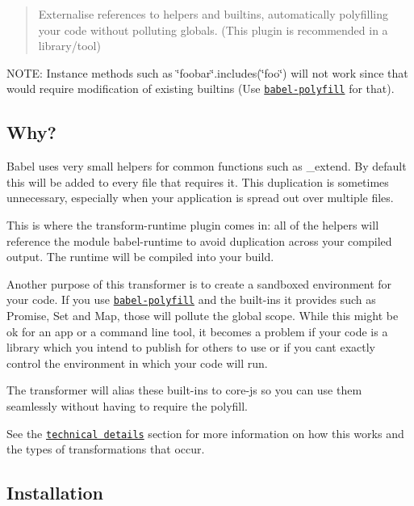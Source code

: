 \begin{quote}
Externalise references to helpers and builtins, automatically polyfilling your code without polluting globals. (This plugin is recommended in a library/tool) \end{quote}


N\+O\+TE\+: Instance methods such as {\ttfamily \char`\"{}foobar\char`\"{}.includes(\char`\"{}foo\char`\"{})} will not work since that would require modification of existing builtins (Use \href{http://babeljs.io/docs/usage/polyfill}{\tt {\ttfamily babel-\/polyfill}} for that).

\subsection*{Why?}

Babel uses very small helpers for common functions such as {\ttfamily \+\_\+extend}. By default this will be added to every file that requires it. This duplication is sometimes unnecessary, especially when your application is spread out over multiple files.

This is where the {\ttfamily transform-\/runtime} plugin comes in\+: all of the helpers will reference the module {\ttfamily babel-\/runtime} to avoid duplication across your compiled output. The runtime will be compiled into your build.

Another purpose of this transformer is to create a sandboxed environment for your code. If you use \href{http://babeljs.io/docs/usage/polyfill/}{\tt babel-\/polyfill} and the built-\/ins it provides such as {\ttfamily Promise}, {\ttfamily Set} and {\ttfamily Map}, those will pollute the global scope. While this might be ok for an app or a command line tool, it becomes a problem if your code is a library which you intend to publish for others to use or if you can\textquotesingle{}t exactly control the environment in which your code will run.

The transformer will alias these built-\/ins to {\ttfamily core-\/js} so you can use them seamlessly without having to require the polyfill.

See the \href{#technical-details}{\tt technical details} section for more information on how this works and the types of transformations that occur.

\subsection*{Installation}

